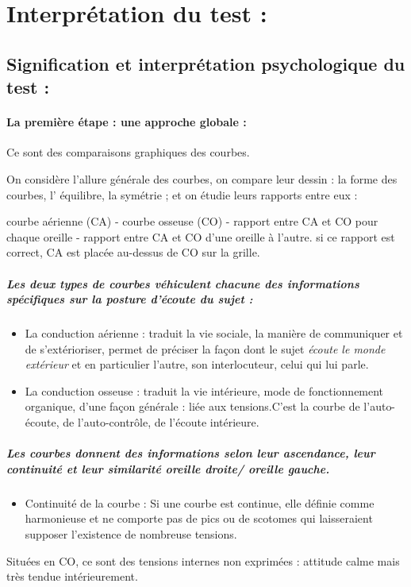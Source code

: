 \section{Interprétation du test : }

\subsection{Signification et interprétation psychologique du test : }

\paragraph{La première étape : une approche globale : }

Ce sont des comparaisons graphiques des courbes. 

On considère l'allure générale des courbes, on compare leur dessin
: la forme des courbes, l' équilibre, la symétrie ; et on étudie leurs
rapports entre eux : 

courbe aérienne (CA) - courbe osseuse (CO) - rapport entre CA et CO
pour chaque oreille - rapport entre CA et CO d\textquoteright une
oreille à l'autre. si ce rapport est correct, CA est placée au-dessus
de CO sur la grille.

\subparagraph{Les deux types de courbes véhiculent chacune des informations spécifiques
sur la posture d'écoute du sujet : }
\begin{itemize}
\item La conduction aérienne : traduit la vie sociale, la manière de communiquer
et de s'extérioriser, permet de préciser la façon dont le sujet\emph{
écoute le monde extérieur} et en particulier l\textquoteright autre,
son interlocuteur, celui qui lui parle. 
\item La conduction osseuse : traduit la vie intérieure, mode de fonctionnement
organique, d'une façon générale : liée aux tensions.C'est la courbe
de l\textquoteright auto-écoute, de l\textquoteright auto-contrôle,
de l'écoute intérieure.
\end{itemize}

\subparagraph{Les courbes donnent des informations selon leur ascendance, leur
continuité et leur similarité oreille droite/ oreille gauche.}
\begin{itemize}
\item Continuité de la courbe : Si une courbe est continue, elle définie
comme harmonieuse et ne comporte pas de pics ou de scotomes qui laisseraient
supposer l'existence de nombreuse tensions.
\end{itemize}
Situées en CO, ce sont des tensions internes non exprimées : attitude
calme mais très tendue intérieurement.


